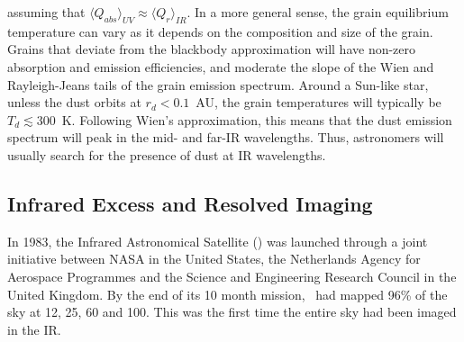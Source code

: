     \noindent assuming that $\langle Q_{abs} \rangle_{UV} \approx \langle Q_{r}\rangle_{IR}$. In a more general sense, the grain equilibrium temperature can vary as it depends on the composition and size of the grain\citep{Draine2003}. Grains that deviate from the blackbody approximation will have non-zero absorption and emission efficiencies, and moderate the slope of the Wien and Rayleigh-Jeans tails of the grain emission spectrum. Around a Sun-like star, unless the dust orbits at $r_d<0.1$~AU, the grain temperatures will typically be $T_d \lesssim 300$~K. Following Wien's approximation, this means that the dust emission spectrum will peak in the mid- and far-IR wavelengths. Thus, astronomers will usually search for the presence of dust at IR wavelengths. 

    \subsection{Infrared Excess and Resolved Imaging}\label{sec:excess_resolvedimaging}

    In 1983, the Infrared Astronomical Satellite (\iras) was launched through a joint initiative between NASA in the United States, the Netherlands Agency for Aerospace Programmes and the Science and Engineering Research Council in the United Kingdom. By the end of its 10 month mission, \iras\ had mapped 96\% of the sky at 12, 25, 60 and 100\micron. This was the first time the entire sky had been imaged in the IR. 
    
